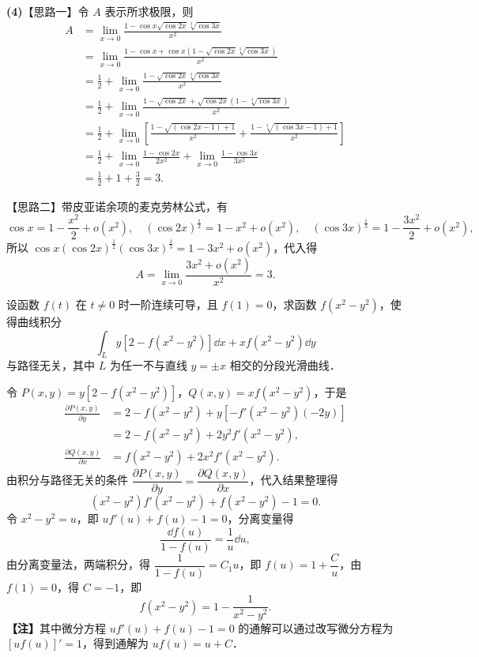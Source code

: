 \begin{solution}
\textbf{(4)}【思路一】令 $A$ 表示所求极限，则
\begin{align*}
A&=\lim_{x\to 0}\frac{1-\cos x\sqrt{\cos 2x}\sqrt[3]{\cos 3x}}{x^{2}}\\
&=\lim_{x\to 0}\frac{1-\cos x+\cos x\left(1-\sqrt{\cos 2x}\sqrt[3]{\cos 3x}\right)}{x^{2}}\\
&=\frac{1}{2}+\lim_{x\to 0}\frac{1-\sqrt{\cos 2x}\sqrt[3]{\cos 3x}}{x^{2}}\\
&=\frac{1}{2}+\lim_{x\to 0}\frac{1-\sqrt{\cos 2x}+\sqrt{\cos 2x}\left(1-\sqrt[3]{\cos 3x}\right)}{x^{2}}\\
&=\frac{1}{2}+\lim_{x\to 0}\left[\frac{1-\sqrt{(\cos 2x-1)+1}}{x^{2}}+\frac{1-\sqrt[3]{(\cos 3x-1)+1}}{x^{2}}\right]\\
&=\frac{1}{2}+\lim_{x\to 0}\frac{1-\cos 2x}{2x^{2}}+\lim_{x\to 0}\frac{1-\cos 3x}{3x^{2}}\\
&=\frac{1}{2}+1+\frac{3}{2}=3.
\end{align*}

【思路二】带皮亚诺余项的麦克劳林公式，有
\[
\cos x=1-\frac{x^{2}}{2}+o\left(x^{2}\right),\quad
(\cos 2x)^{\frac{1}{2}}=1-x^{2}+o\left(x^{2}\right),\quad
(\cos 3x)^{\frac{1}{3}}=1-\frac{3x^{2}}{2}+o\left(x^{2}\right),
\]
所以 $\cos x(\cos 2x)^{\frac{1}{2}}(\cos 3x)^{\frac{1}{3}}=1-3x^{2}+o\left(x^{2}\right)$，代入得
\[
A=\lim_{x\to 0}\frac{3x^{2}+o\left(x^{2}\right)}{x^{2}}=3.
\]
\end{solution}

设函数 $f(t)$ 在 $t\ne 0$ 时一阶连续可导，且 $f(1)=0$，求函数 $f\left(x^{2}-y^{2}\right)$，使得曲线积分
\[
\int_{L}y\left[2-f\left(x^{2}-y^{2}\right)\right]\dd x+xf\left(x^{2}-y^{2}\right)\dd y
\]
与路径无关，其中 $L$ 为任一不与直线 $y=\pm x$ 相交的分段光滑曲线．
\begin{solution}
令 $P(x,y)=y\left[2-f\left(x^{2}-y^{2}\right)\right]$，$Q(x,y)=xf\left(x^{2}-y^{2}\right)$，于是
\begin{align*}
\frac{\partial P(x,y)}{\partial y}
&=2-f\left(x^{2}-y^{2}\right)+y\left[-f'\left(x^{2}-y^{2}\right)(-2y)\right]\\
&=2-f\left(x^{2}-y^{2}\right)+2y^{2}f'\left(x^{2}-y^{2}\right),\\
\frac{\partial Q(x,y)}{\partial x}
&=f\left(x^{2}-y^{2}\right)+2x^{2}f'\left(x^{2}-y^{2}\right).
\end{align*}
由积分与路径无关的条件 $\dfrac{\partial P(x,y)}{\partial y}=\dfrac{\partial Q(x,y)}{\partial x}$，代入结果整理得
\[
\left(x^{2}-y^{2}\right)f'\left(x^{2}-y^{2}\right)+f\left(x^{2}-y^{2}\right)-1=0.
\]
令 $x^{2}-y^{2}=u$，即 $uf'(u)+f(u)-1=0$，分离变量得
\[
\frac{\dd f(u)}{1-f(u)}=\frac{1}{u}\dd u,
\]
由分离变量法，两端积分，得 $\dfrac{1}{1-f(u)}=C_{1}u$，即 $f(u)=1+\dfrac{C}{u}$，由 $f(1)=0$，得 $C=-1$，即
\[
f\left(x^{2}-y^{2}\right)=1-\frac{1}{x^{2}-y^{2}}.
\]
\textbf{【注】}其中微分方程 $uf'(u)+f(u)-1=0$ 的通解可以通过改写微分方程为 $\left[uf(u)\right]'=1$，得到通解为 $uf(u)=u+C$．
\end{solution}

